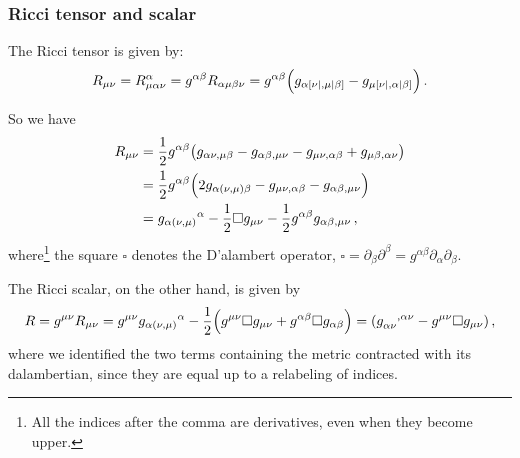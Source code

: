 \documentclass[main.tex]{subfiles}
\begin{document}
\subsubsection{Ricci tensor and scalar}

The Ricci tensor is given by: 
%
\begin{equation}
  R_{\mu \nu } = R^{\alpha }_{\mu \alpha \nu } 
  = g^{\alpha \beta }R_{\alpha \mu \beta \nu }
  = g^{\alpha \beta }\qty(g_{\alpha [\nu|, \mu | \beta ]} - g_{\mu [\nu|, \alpha | \beta ]})
\,.
\end{equation}
%


So we have 
%
\begin{subequations}
    \begin{align}
    R_{\mu \nu }
    &= \frac{1}{2} g^{\alpha \beta }\qty(
      g_{\alpha \nu , \mu \beta }
      -g_{\alpha \beta , \mu \nu }
      - g_{\mu \nu , \alpha \beta }
      + g_{\mu \beta , \alpha \nu }
    )  \\
    &= \frac{1}{2} g^{\alpha \beta }\qty(
      2 g_{\alpha (\nu , \mu ) \beta }
      - g_{\mu \nu , \alpha \beta }
      - g_{\alpha \beta , \mu \nu }
    )  \\
    &= g_{\alpha (\nu , \mu )}\,\!^{\alpha } 
    - \frac{1}{2} \square g_{\mu \nu }
    - \frac{1}{2} g^{\alpha \beta }g_{\alpha \beta , \mu \nu }
    \label{eq:Ricci-tensor-LIF}
\,,
\end{align}
\end{subequations}
%
where\footnote{All the indices after the comma are derivatives, even when they become upper.} the square \(\square\) denotes the D'alambert operator, \(\square = \partial_{\beta }\partial^{\beta } = g^{\alpha \beta }\partial_{\alpha }\partial_{\beta }\).

The Ricci scalar, on the other hand, is given by 
%
\begin{equation} \label{eq:ricci-scalar-LIF} 
  R = g^{\mu \nu }R_{\mu \nu }
  =  g^{\mu \nu }g_{\alpha (\nu , \mu )}\,\!^{\alpha }
  - \frac{1}{2} \qty( g^{\mu \nu }\square g_{\mu \nu }
  + g^{\alpha \beta } \square g_{\alpha \beta } )
  = (\tensor{g}{_{\alpha \nu }^{, \alpha \nu }}
   -g^{\mu \nu } \square g_{\mu \nu })
\,,
\end{equation}
%
where we identified the two terms containing the metric contracted with its dalambertian, since they are equal up to a relabeling of indices.
\end{document}
